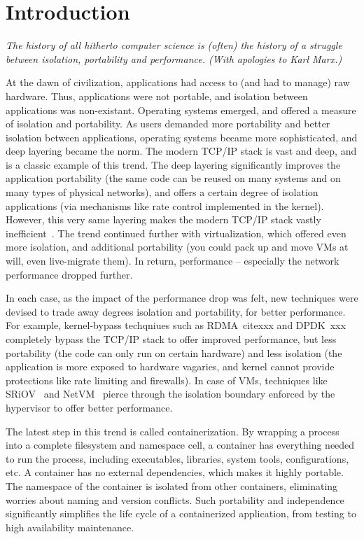 \section{Introduction} 
\label{sec:introduction}

{\em 
The history of all hitherto computer science is (often) the history of a
struggle between isolation, portability and performance. (With apologies to Karl
Marx.)}

At the dawn of civilization, applications had access to (and had to manage) raw
hardware. Thus, applications were not portable, and isolation between
applications was non-existant. Operating systems emerged, and offered a measure
of isolation and portability. As users demanded more portability and better
isolation between applications, operating systems became more sophisticated, and
deep layering became the norm. The modern TCP/IP stack is vast and deep, and is
a classic example of this trend. The deep layering significantly improves the
application portability (the same code can be reused on many systems and on many
types of physical networks), and offers a certain degree of isolation
applications (via mechanisms like rate control implemented in the kernel).
However, this very same layering makes the modern TCP/IP stack vastly
inefficient~\cite{dcqcn,luigipapers}.  The trend continued further with
virtualization, which offered even more isolation, and additional portability
(you could pack up and move VMs at will, even live-migrate them). In return,
performance -- especially the network performance dropped further. 

In each case, as the impact of the performance drop was felt, new techniques
were devised to trade away degrees isolation and portability, for better
performance. For example, kernel-bypass techqniues such as RDMA~cite{xxx} and
DPDK~{xxx} completely bypass the TCP/IP stack to offer improved performance, but
less portability (the code can only run on certain hardware) and less isolation
(the application is more exposed to hardware vagaries, and kernel cannot provide
protections like rate limiting and firewalls). In case of VMs, techniques like
SRiOV~\cite{xxx} and NetVM~\cite{xxx} pierce through the isolation boundary
enforced by the hypervisor to offer better performance. 

The latest step in this trend is called containerization.  By wrapping a process
into a complete filesystem and namespace cell, a container has everything needed
to run the process, including executables, libraries, system tools,
configurations, etc. A container has no external dependencies, which makes it
highly portable. The namespace of the container is isolated from other
containers, eliminating worries about naming and version conflicts.  Such
portability and independence significantly simplifies the life cycle of a
containerized application, from testing to high availability maintenance.

